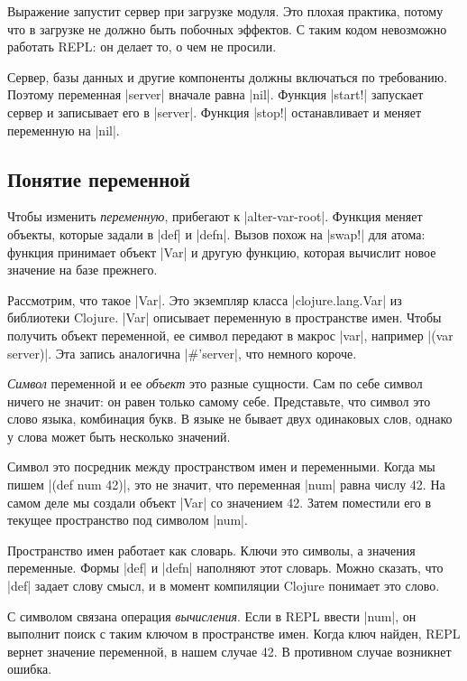 Выражение запустит сервер при загрузке модуля. Это плохая практика, потому что в
загрузке не должно быть побочных эффектов. С таким кодом невозможно работать
REPL: он делает то, о чем не просили.

Сервер, базы данных и другие компоненты должны включаться по требованию. Поэтому
переменная \spverb|server| вначале равна \spverb|nil|. Функция \spverb|start!|
запускает сервер и записывает его в \spverb|server|. Функция \spverb|stop!|
останавливает и меняет переменную на \spverb|nil|.

\subsection{Понятие переменной}

\label{var-section}

Чтобы изменить \emph{переменную}, прибегают к \spverb|alter-var-root|. Функция
меняет объекты, которые задали в \spverb|def| и \spverb|defn|. Вызов похож на
\spverb|swap!| для атома: функция принимает объект \spverb|Var| и другую
функцию, которая вычислит новое значение на базе прежнего.

Рассмотрим, что такое \spverb|Var|. Это экземпляр класса \spverb|clojure.lang.Var|
из библиотеки Clojure. \spverb|Var| описывает переменную в пространстве имен.
Чтобы получить объект переменной, ее символ передают в макрос \spverb|var|,
например \spverb|(var server)|. Эта запись аналогична \spverb|#'server|,
что немного короче.

\emph{Символ} переменной и ее \emph{объект} это разные сущности. Сам по себе
символ ничего не значит: он равен только самому себе. Представьте, что символ
это слово языка, комбинация букв. В языке не бывает двух одинаковых слов, однако
у слова может быть несколько значений.

Символ это посредник между пространством имен и переменными. Когда мы пишем
\spverb|(def num 42)|, это не значит, что переменная \spverb|num| равна числу
42. На самом деле мы создали объект \spverb|Var| со значением 42. Затем
поместили его в текущее пространство под символом \spverb|num|.

Пространство имен работает как словарь. Ключи это символы, а значения
переменные. Формы \spverb|def| и \spverb|defn| наполняют этот словарь. Можно
сказать, что \spverb|def| задает слову смысл, и в момент компиляции Clojure
понимает это слово.

С символом связана операция \emph{вычисления}. Если в REPL ввести \spverb|num|,
он выполнит поиск с таким ключом в пространстве имен. Когда ключ найден, REPL
вернет значение переменной, в нашем случае 42. В противном случае возникнет
ошибка.

